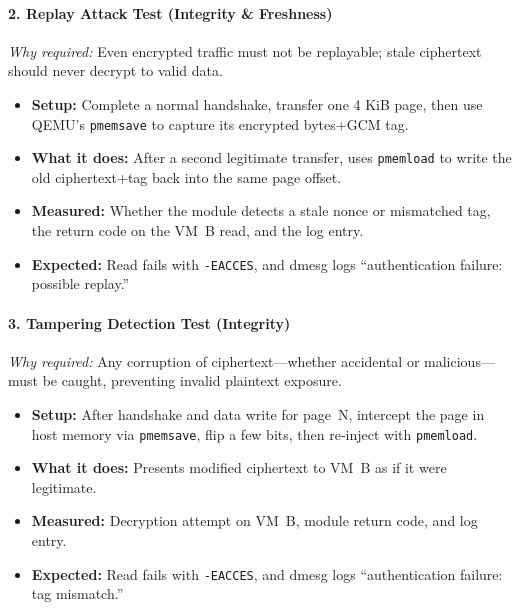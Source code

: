 \documentclass[conference]{IEEEtran}
\begin{document}
\paragraph{2. Replay Attack Test (Integrity \& Freshness)}
\emph{Why required:} Even encrypted traffic must not be replayable; stale ciphertext should never decrypt to valid data.
\begin{itemize}
  \item \textbf{Setup:} Complete a normal handshake, transfer one 4 KiB page, then use QEMU’s \texttt{pmemsave} to capture its encrypted bytes+GCM tag.
  \item \textbf{What it does:} After a second legitimate transfer, uses \texttt{pmemload} to write the old ciphertext+tag back into the same page offset.
  \item \textbf{Measured:} Whether the module detects a stale nonce or mismatched tag, the return code on the VM~B read, and the log entry.
  \item \textbf{Expected:} Read fails with \texttt{-EACCES}, and dmesg logs “authentication failure: possible replay.”
\end{itemize}

\paragraph{3. Tampering Detection Test (Integrity)}
\emph{Why required:} Any corruption of ciphertext—whether accidental or malicious—must be caught, preventing invalid plaintext exposure.
\begin{itemize}
  \item \textbf{Setup:} After handshake and data write for page~N, intercept the page in host memory via \texttt{pmemsave}, flip a few bits, then re‐inject with \texttt{pmemload}.
  \item \textbf{What it does:} Presents modified ciphertext to VM~B as if it were legitimate.
  \item \textbf{Measured:} Decryption attempt on VM~B, module return code, and log entry.
  \item \textbf{Expected:} Read fails with \texttt{-EACCES}, and dmesg logs “authentication failure: tag mismatch.”
\end{itemize}
\end{document}

